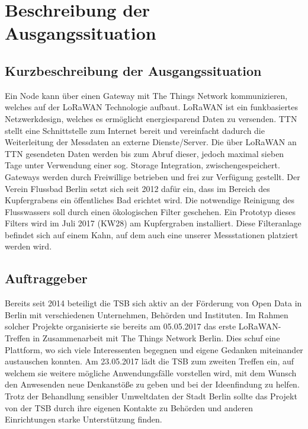 \section{Beschreibung der Ausgangssituation}

\subsection{Kurzbeschreibung der Ausgangssituation}

Ein Node kann \"uber einen Gateway mit The Things Network kommunizieren, welches auf der LoRaWAN Technologie aufbaut.
LoRaWAN ist ein funkbasiertes Netzwerkdesign, welches es ermöglicht energiesparend Daten zu versenden. TTN stellt eine Schnittstelle zum
Internet bereit und vereinfacht dadurch die Weiterleitung der Messdaten an externe Dienste/Server. Die über LoRaWAN an TTN gesendeten Daten
werden bis zum Abruf dieser, jedoch maximal sieben Tage unter Verwendung einer sog. \glqq Storage Integration\grqq, zwischengespeichert.
Gateways werden durch Freiwillige betrieben und frei zur Verfügung gestellt.\newline
Der Verein Flussbad Berlin setzt sich seit 2012 dafür ein, dass im Bereich des Kupfergrabens ein öffentliches Bad erichtet wird. Die notwendige Reinigung des Flusswassers soll durch einen ökologischen Filter geschehen. Ein Prototyp dieses Filters wird im Juli 2017 (KW28) am Kupfergraben installiert.
Diese Filteranlage befindet sich auf einem Kahn, auf dem auch eine unserer Messstationen platziert werden wird.

\subsection{Auftraggeber}

Bereits seit 2014 beteiligt die TSB sich aktiv an der Förderung von \glqq Open Data\grqq{} in Berlin mit verschiedenen Unternehmen, Behörden und Instituten.
Im Rahmen solcher Projekte organisierte sie bereits am 05.05.2017 das erste \glqq LoRaWAN-Treffen\grqq{} in Zusammenarbeit mit The Things Network Berlin. Dies schuf eine Plattform, wo sich viele Interessenten begegnen und eigene Gedanken miteinander austauschen konnten.\newline
Am 23.05.2017 lädt die TSB zum zweiten Treffen ein, auf welchem sie weitere m\"ogliche Anwendungsfälle vorstellen wird, mit dem Wunsch den Anwesenden neue Denkanstöße zu geben und bei der Ideenfindung zu helfen.\newline
Trotz der Behandlung sensibler Umweltdaten der Stadt Berlin sollte das Projekt von der TSB durch ihre eigenen Kontakte zu Behörden und anderen Einrichtungen starke Unterst\"utzung
finden.\newline

